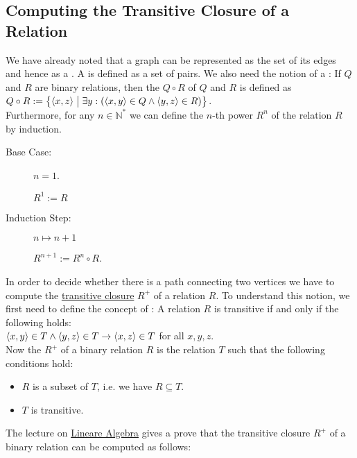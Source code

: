 \subsection{Computing the Transitive Closure of a Relation}
We have already noted that a graph can be represented as the set of its edges and hence as a .
A  is defined as a set of pairs.  We also need the notion of a :
If $Q$ and $R$ are binary relations, then the  $Q \circ R$ of $Q$ and $R$ is defined as
\\[0.2cm]
\hspace*{1.3cm}
$Q \circ R := \bigl\{ \pair(x, z) \bigm| \exists y:(\pair(x,y) \in Q \wedge \pair(y,z) \in R) \bigr\}$.
\\[0.2cm]
Furthermore, for any $n \in \mathbb{N}^*$ we can define the $n$-th power $R^n$ of the relation $R$ by induction.
\begin{description}
\item[Base Case:] $n = 1$.

             $R^1 := R$
\item[Induction Step:] $n \mapsto n+1$ 

             $R^{n+1} := R^n \circ R$.
\end{description}
In order to decide whether there is a path connecting two vertices we have to compute the 
\href{https://en.wikipedia.org/wiki/Transitive_closure}{transitive closure} $R^+$ of a relation $R$.  
To understand this notion, we first need to define the concept of :  A relation $R$ is
transitive if and only if the following holds:
\\[0.2cm]
\hspace*{1.3cm}
$\pair(x,y) \in T \wedge \pair(y, z) \in T \rightarrow \pair(x, z) \in T$ \quad for all $x,y,z$. 
\\[0.2cm]
Now the  $R^+$ of a binary relation $R$ is the  relation $T$ such that the following
conditions hold:
\begin{itemize}
\item $R$ is a subset of $T$, i.e. we have $R \subseteq T$.
\item $T$ is transitive.
\end{itemize}
The lecture on
\href{https://github.com/karlstroetmann/Lineare-Algebra/blob/master/Script/lineare-algebra.pdf}{Lineare Algebra} 
gives a prove that the transitive closure $R^+$ of a binary relation can be computed as follows:
\\[0.2cm]
